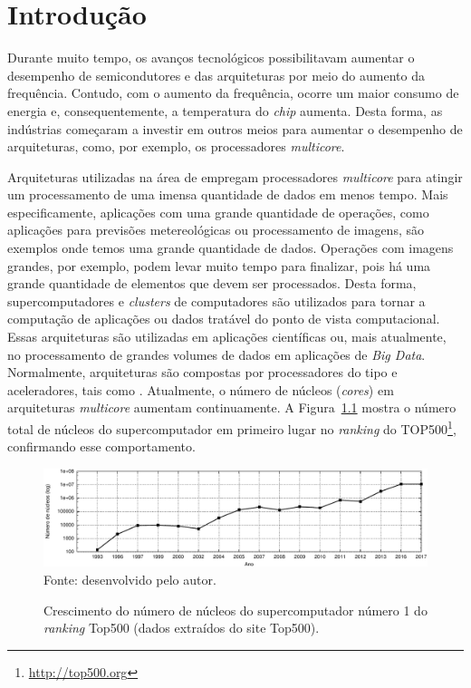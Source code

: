 \chapter{Introdução}
\label{cha:introducao}

Durante muito tempo, os avanços tecnológicos possibilitavam aumentar o
desempenho de semicondutores e das arquiteturas por meio do aumento da
frequência. Contudo, com o aumento da frequência, ocorre um maior consumo de
energia e, consequentemente, a temperatura do \textit{chip} aumenta. Desta
forma, as indústrias começaram a investir em outros meios para aumentar o
desempenho de arquiteturas, como, por exemplo, os processadores \textit{multicore}.

Arquiteturas utilizadas na área de \hpc empregam processadores \textit{multicore} para atingir um
processamento de uma imensa quantidade de dados em menos tempo. Mais especificamente,
aplicações com uma grande quantidade de operações, como aplicações para
previsões metereológicas ou processamento de imagens, são exemplos onde temos
uma grande quantidade de dados. Operações com imagens grandes, por exemplo,
podem levar muito tempo para finalizar, pois há uma grande quantidade de
elementos que devem ser processados. Desta forma, supercomputadores e
\textit{clusters} de computadores são utilizados para tornar a computação de
aplicações ou dados tratável do ponto de vista computacional. Essas arquiteturas
são utilizadas em aplicações científicas ou, mais atualmente, no processamento
de grandes volumes de dados em aplicações de \textit{Big Data}. Normalmente, arquiteturas
\hpc são compostas por processadores do tipo \cpu{} e aceleradores, tais como \gpu.
Atualmente, o número de núcleos (\textit{cores}) em arquiteturas \textit{multicore}
aumentam continuamente. A Figura~\ref{fig:graphCores} mostra o número total de
núcleos do supercomputador em primeiro lugar no \textit{ranking} do
TOP500\footnote{\url{http://top500.org}}, confirmando esse comportamento.


\begin{figure}[t]
	\centering
	\caption{Crescimento do número de núcleos do supercomputador número 1 do
        \textit{ranking} Top500 (dados extraídos do site Top500).}
	\includegraphics[width=\textwidth]{figs/top500.pdf} \\
    Fonte: desenvolvido pelo autor.
	\label{fig:graphCores}
\end{figure}

